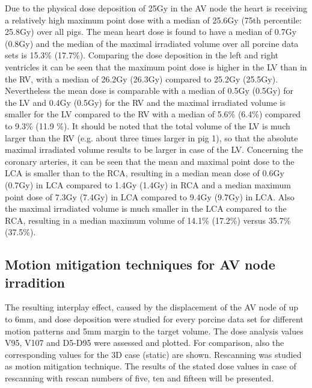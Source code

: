 \documentclass[type=dr, dr=rernat, accentcolor=tud7b,colorbacktitle, bigchapter, openright, twoside, 12pt ]{tudthesis}
\begin{document}
Due to the physical dose deposition of 25Gy in the AV node the heart is receiving a relatively high maximum point dose with a median of 
25.6Gy (75th percentile: 25.8Gy) over all pigs. The mean heart dose is found to have a median of 0.7Gy (0.8Gy) and the median of the 
maximal irradiated volume over all porcine data sets is 15.3\% (17.7\%). Comparing the dose deposition in the left and right ventricles 
it can be seen that the maximum point dose is higher in the LV than in the RV, with a median of 26.2Gy (26.3Gy) compared to 25.2Gy (25.5Gy). 
Nevertheless the mean dose is comparable with a median of 0.5Gy (0.5Gy) for the LV and 0.4Gy (0.5Gy) for the RV and the maximal irradiated 
volume is smaller for the LV compared to the RV with a median of 5.6\% (6.4\%) compared to 9.3\% (11.9 \%). It should be noted that the total 
volume of the LV is much larger than the RV (e.g. about three times larger in pig 1), so that the absolute maximal irradiated volume 
results to be larger in case of the LV. Concerning the coronary arteries, 
it can be seen that the mean and maximal point dose to the LCA is smaller than to the RCA, resulting in a median mean dose of 0.6Gy (0.7Gy) 
in LCA compared to 1.4Gy (1.4Gy) in RCA and a median maximum point dose of 7.3Gy (7.4Gy) in LCA compared to 9.4Gy (9.7Gy) in LCA. 
Also the maximal irradiated volume is much smaller in the LCA compared to the RCA, resulting in a median maximum volume of 14.1\% (17.2\%) 
versus 35.7\% (37.5\%). 

\subsection{Motion mitigation techniques for AV node irradition}

The resulting interplay effect, caused by the displacement of the AV node of up to 6mm, and dose deposition were studied for every porcine 
data set for different motion patterns and 5mm margin to the target volume. The dose analysis values V95, V107 and D5-D95 were assessed and 
plotted. For comparison, also the corresponding values for the 3D case (static) are shown. Rescanning was studied as motion mitigation 
technique. The results of the stated dose values in case of rescanning with rescan numbers of five, ten and fifteen will be presented. 
\end{document}
